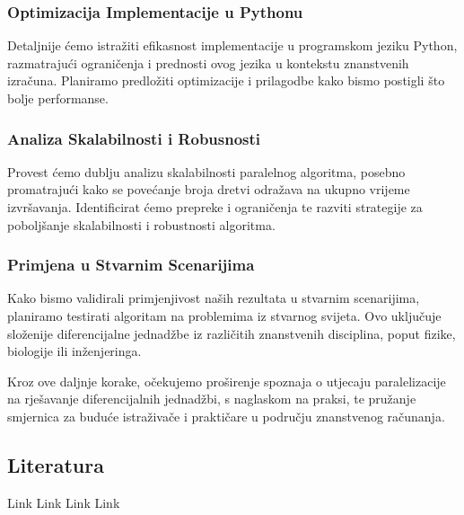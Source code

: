 \documentclass[conference]{IEEEtran}
\begin{document}
\subsubsection{Optimizacija Implementacije u Pythonu}

Detaljnije ćemo istražiti efikasnost implementacije u programskom jeziku Python, razmatrajući ograničenja i prednosti ovog jezika u kontekstu znanstvenih izračuna. Planiramo predložiti optimizacije i prilagodbe kako bismo postigli što bolje performanse.

\subsubsection{Analiza Skalabilnosti i Robusnosti}

Provest ćemo dublju analizu skalabilnosti paralelnog algoritma, posebno promatrajući kako se povećanje broja dretvi odražava na ukupno vrijeme izvršavanja. Identificirat ćemo prepreke i ograničenja te razviti strategije za poboljšanje skalabilnosti i robustnosti algoritma.

\subsubsection{Primjena u Stvarnim Scenarijima}

Kako bismo validirali primjenjivost naših rezultata u stvarnim scenarijima, planiramo testirati algoritam na problemima iz stvarnog svijeta. Ovo uključuje složenije diferencijalne jednadžbe iz različitih znanstvenih disciplina, poput fizike, biologije ili inženjeringa.\newline

Kroz ove daljnje korake, očekujemo proširenje spoznaja o utjecaju paralelizacije na rješavanje diferencijalnih jednadžbi, s naglaskom na praksi, te pružanje smjernica za buduće istraživače i praktičare u području znanstvenog računanja.

\subsection{Literatura}

Link \cite{Stack} 
Link \cite{Pik}
Link \cite{Youtube1}
Link \cite{Youtube2}




\end{document}
